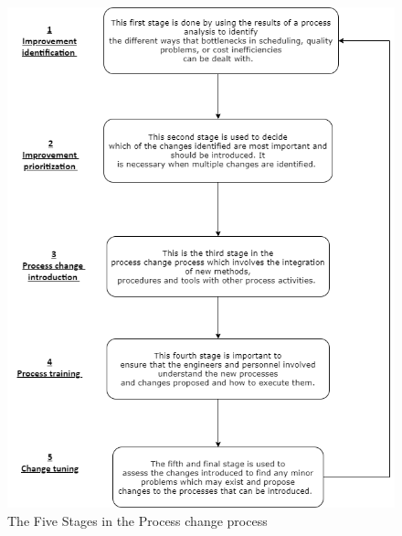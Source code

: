 \documentclass{article}
\begin{document}
    \begin{figure}[ht!]
   	\includegraphics[width =\textwidth, ]{images/pcp.png}
   	\caption{The Five Stages in the Process change process \cite{pcp}}
   \end{figure}
\vfill
   
\end{document}
